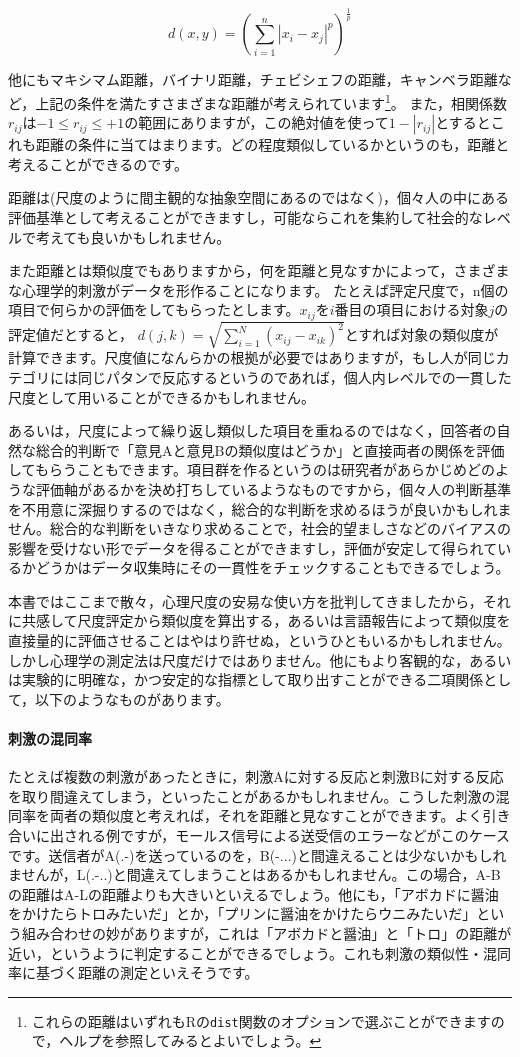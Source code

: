 \documentclass{ltjsbook}
\begin{document}
\[ d(x,y) = \left( \sum_{i=1}^n |x_i - x_j|^p\right)^{\frac{1}{p}} \]


他にもマキシマム距離，バイナリ距離，チェビシェフの距離，キャンベラ距離など，上記の条件を満たすさまざまな距離が考えられています\footnote{これらの距離はいずれもRの\texttt{dist}関数のオプションで選ぶことができますので，ヘルプを参照してみるとよいでしょう。}。
また，相関係数$r_{ij}$は$-1 \le r_{ij} \le +1$の範囲にありますが，この絶対値を使って$1-|r_{ij}|$とするとこれも距離の条件に当てはまります。どの程度類似しているかというのも，距離と考えることができるのです。

距離は(尺度のように間主観的な抽象空間にあるのではなく)，個々人の中にある評価基準として考えることができますし，可能ならこれを集約して社会的なレベルで考えても良いかもしれません。

また距離とは類似度でもありますから，何を距離と見なすかによって，さまざまな心理学的刺激がデータを形作ることになります。
たとえば評定尺度で，n個の項目で何らかの評価をしてもらったとします。$x_{ij}$を$i$番目の項目における対象$j$の評定値だとすると，
$d(j,k) = \sqrt{\sum_{i=1}^N (x_{ij}-x_{ik})^2 }$とすれば対象の類似度が計算できます。尺度値になんらかの根拠が必要ではありますが，もし人が同じカテゴリには同じパタンで反応するというのであれば，個人内レベルでの一貫した尺度として用いることができるかもしれません。

あるいは，尺度によって繰り返し類似した項目を重ねるのではなく，回答者の自然な総合的判断で「意見Aと意見Bの類似度はどうか」と直接両者の関係を評価してもらうこともできます。項目群を作るというのは研究者があらかじめどのような評価軸があるかを決め打ちしているようなものですから，個々人の判断基準を不用意に深掘りするのではなく，総合的な判断を求めるほうが良いかもしれません。総合的な判断をいきなり求めることで，社会的望ましさなどのバイアスの影響を受けない形でデータを得ることができますし，評価が安定して得られているかどうかはデータ収集時にその一貫性をチェックすることもできるでしょう。

本書ではここまで散々，心理尺度の安易な使い方を批判してきましたから，それに共感して尺度評定から類似度を算出する，あるいは言語報告によって類似度を直接量的に評価させることはやはり許せぬ，というひともいるかもしれません。
しかし心理学の測定法は尺度だけではありません。他にもより客観的な，あるいは実験的に明確な，かつ安定的な指標として取り出すことができる二項関係として，以下のようなものがあります\parencite{Takane198002}。

\paragraph{刺激の混同率}たとえば複数の刺激があったときに，刺激Aに対する反応と刺激Bに対する反応を取り間違えてしまう，といったことがあるかもしれません。こうした刺激の混同率を両者の類似度と考えれば，それを距離と見なすことができます。よく引き合いに出される例ですが，モールス信号による送受信のエラーなどがこのケースです。送信者がA(.-)を送っているのを，B(-...)と間違えることは少ないかもしれませんが，L(.-..)と間違えてしまうことはあるかもしれません。この場合，A-Bの距離はA-Lの距離よりも大きいといえるでしょう。他にも，「アボカドに醤油をかけたらトロみたいだ」とか，「プリンに醤油をかけたらウニみたいだ」という組み合わせの妙がありますが，これは「アボカドと醤油」と「トロ」の距離が近い，というように判定することができるでしょう。これも刺激の類似性・混同率に基づく距離の測定といえそうです。
\end{document}
